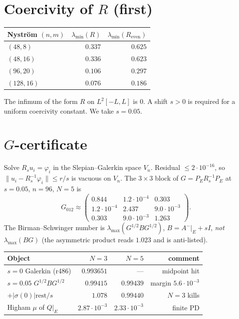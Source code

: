 \documentclass[11pt]{article}
\theoremstyle{remark}
\begin{document}
\section{Coercivity of $R$ (first)}

\begin{center}
\small
\begin{tabular}{@{}lrr@{}}
\toprule
Nystr\"om $(n,m)$ & $\lambda_{\min}(R)$ & $\lambda_{\min}(R_{\mathrm{even}})$ \\
\midrule
$(48,8)$ & $0.337$ & $0.625$ \\
$(48,16)$ & $0.336$ & $0.623$ \\
$(96,20)$ & $0.106$ & $0.297$ \\
$(128,16)$ & $0.076$ & $0.186$ \\
\bottomrule
\end{tabular}
\end{center}

The infimum of the form $R$ on $L^2[-L,L]$ is $0$.
A shift $s>0$ is required for a uniform coercivity
constant.  We take $s=0.05$.

\section{$G$-certificate}

Solve $R_su_i=\varphi_i$ in the Slepian--Galerkin
space $V_n$.  Residual $\le2\cdot10^{-16}$, so
$\|u_i-R_s^{-1}\varphi_i\|\le r/s$ is vacuous on $V_n$.
The $3\times3$ block of $G=P_ER_s^{-1}P_E$ at
$s=0.05$, $n=96$, $N=5$ is
\[
G_{012}\approx
\begin{pmatrix}
0.844 & 1.2\cdot10^{-4} & 0.303 \\
1.2\cdot10^{-4} & 2.437 & 9.0\cdot10^{-3} \\
0.303 & 9.0\cdot10^{-3} & 1.263
\end{pmatrix}.
\]
The Birman--Schwinger number is
$\lambda_{\max}(G^{1/2}BG^{1/2})$,
$B=A^-|_E+sI$, \emph{not} $\lambda_{\max}(BG)$
(the asymmetric product reads $1.023$ and is
anti-listed).

\begin{center}
\small
\begin{tabular}{@{}lrrr@{}}
\toprule
Object & $N=3$ & $N=5$ & comment \\
\midrule
$s=0$ Galerkin (r486)
  & $0.993651$ & --- & midpoint hit \\
$s=0.05$ $G^{1/2}BG^{1/2}$
  & $0.99415$ & $0.99439$ & margin $5.6\cdot10^{-3}$ \\
$+|\sigma(0)|\mathrm{rest}/s$
  & $1.078$ & $0.99440$ & $N=3$ kills \\
Higham $\mu$ of $Q|_E$
  & $2.87\cdot10^{-3}$ & $2.33\cdot10^{-3}$ & finite PD \\
\bottomrule
\end{tabular}
\end{center}
\end{document}
